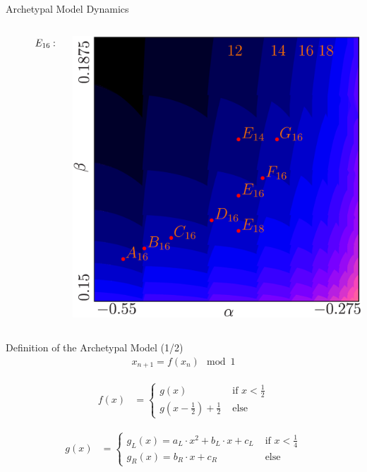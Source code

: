 \begin{frame}{Archetypal Model Dynamics}
{\begin{columns}
\begin{column}{.9 \textwidth}
\begin{figure}
{					}{$E_{16}:\:\mathcal{O}_{\mathcal{A}^5\mathcal{B}^3\mathcal{C}^5\mathcal{D}^3}$}
				\end{figure}
			\end{column}
			\begin{column}{.2 \textwidth}
				\vspace{-4em}
				\begin{center}
					\hspace{-2em}
					\includegraphics[height=0.3 \textheight]{../Figures/6/6.1a/result.png}
				\end{center}
			\end{column}
		\end{columns}
	}
\end{frame}

\begin{frame}{Definition of the Archetypal Model (1/2)}
	\vspace{-3.0em}
	\begin{align}
		x_{n+1} = f(x_n) \mod 1
	\end{align}

	\begin{align}
		f(x) & = \begin{cases}
			         g(x)                                        & \text{ if } x < \frac{1}{2} \\
			         g\left(x - \frac{1}{2}\right) + \frac{1}{2} & \text{ else}
		         \end{cases}
	\end{align}

	\begin{align}
		g(x) & = \begin{cases}
			         g_L(x) = a_L \cdot x^2 + b_L \cdot x + c_L & \text{ if } x < \frac{1}{4} \\
			         g_R(x) = b_R \cdot x + c_R                 & \text{ else}
		         \end{cases}
	\end{align}
\end{frame}

